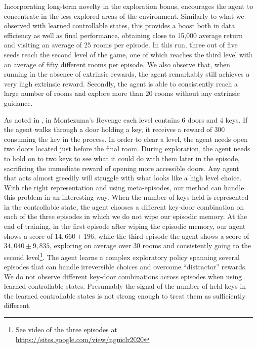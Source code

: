 \documentclass{article} %
\begin{document}
Incorporating long-term novelty in the exploration bonus, encourages the agent to concentrate in the less explored areas of the environment. Similarly to what we observed with learned controllable states, this provides a boost both in data efficiency as well as final performance, obtaining close to 15,000 average return and visiting an average of 25 rooms per episode. In this run, three out of five seeds reach the second level of the game, one of which reaches the third level with an average of fifty different rooms per episode.
%
We also observe that, when running in the absence of extrinsic rewards, the agent remarkably still achieves a very high extrinsic reward. Secondly, the agent is able to consistently reach a large number of rooms and explore more than $20$ rooms without any extrinsic guidance.
%

As noted in \citet{burda2018exploration}, in Montezuma's Revenge each level contains $6$ doors and $4$ keys. If the agent walks through a door holding a key, it receives a reward of $300$ consuming the key in the process. In order to clear a level, the agent needs open two doors located just before the final room. 
%
During exploration, the agent needs to hold on to two keys to see what it could do with them later in the episode, sacrificing the immediate reward of opening more accessible doors. Any agent that acts almost greedily will struggle with what looks like a high level choice. 
With the right representation and using meta-episodes, our method can handle this problem in an interesting way. When the number of keys held is represented in the controllable state, the agent chooses a different key-door combination on each of the three episodes in which we do not wipe our episodic memory.
%
At the end of training, in the first episode after wiping the episodic memory, our agent shows a score of $14,660 \pm 196$, while the third episode the agent shows a score of $34,040 \pm 9,835$, exploring on average over 30 rooms and consistently going to the second level\footnote{See video of the three episodes at \url{https://sites.google.com/view/nguiclr2020}}.
%
The agent learns a complex exploratory policy spanning several episodes that can handle irreversible choices and overcome  ``distractor'' rewards. 
%
We do not observe different key-door combinations across episodes when using learned controllable states. Presumably the signal of the number of held keys in the learned controllable states is not strong enough to treat them as sufficiently different.
\end{document}

